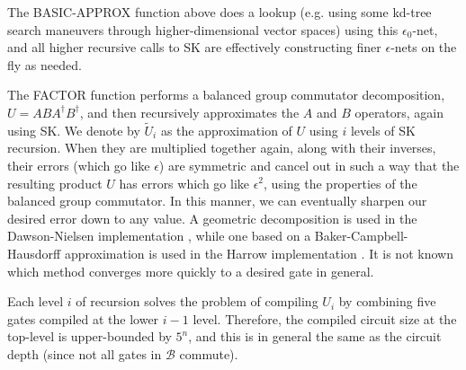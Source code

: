 The BASIC-APPROX function above does a lookup (e.g. using some kd-tree search
maneuvers through higher-dimensional vector spaces) using this $\epsilon_0$-net,
and all higher recursive calls to SK are effectively constructing
finer $\epsilon$-nets on the fly as needed.

The FACTOR function performs a balanced group commutator decomposition,
$U = ABA^\dagger B^\dagger$, and then recursively approximates the $A$ and $B$
operators, again using SK. We denote by $\tilde{U}_i$ as the approximation
of $U$ using $i$ levels of SK recursion. When they are multiplied
together again, along with their inverses, their errors (which go like
$\epsilon$) are symmetric and cancel out in such a way that the resulting
product $U$ has errors which go like $\epsilon^2$, using the properties of
the balanced group commutator. In this manner, we can
eventually sharpen our desired error down to any value. A
geometric decomposition is used in the Dawson-Nielsen implementation \cite{Dawson2005},
while one based on a Baker-Campbell-Hausdorff approximation is used in the
Harrow implementation \cite{Harrow2001}. It is not
known which method converges more quickly to a desired gate in general.


Each level $i$ of recursion solves the problem of compiling 
$U_i$ by combining five gates compiled at the lower $i-1$ level.
Therefore, the compiled circuit size at the top-level is upper-bounded by $5^n$,
and
this is in general the same as the circuit depth (since not all gates in
$\mathcal{B}$ commute).

